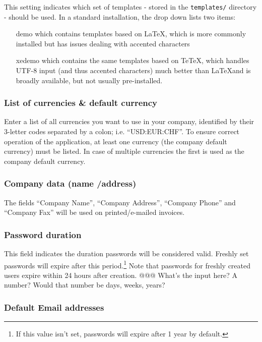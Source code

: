 This setting indicates which set of templates - stored in the
   \texttt{templates/} directory - should be used. In a standard installation, the drop down
   lists two items:
   \begin{itemize}
   \item [demo] which contains templates based on \LaTeX, which is more commonly installed but has issues dealing with accented characters
   \item [xedemo] which contains the same templates based on TeTeX, which handles UTF-8 input (and thus accented characters) much better than \LaTeX and is broadly available, but not usually pre-installed.
   \end{itemize}


\subsubsection{List of currencies \& default currency}

Enter a list of all currencies you want
to use in your company, identified by their 3-letter codes separated by a colon; i.e.
``USD:EUR:CHF''. To ensure correct operation of the application, at least one currency
(the company default currency) must be listed. In case of multiple currencies the first
is used as the company default currency.
\subsubsection{Company data (name /address)}

The fields ``Company Name'', ``Company Address'',
``Company Phone'' and ``Company Fax'' will be used on printed/e-mailed invoices.

\subsubsection{Password duration} This field indicates the duration passwords will be considered valid. Freshly set passwords will expire after this period.\footnote{If this value isn't set, passwords will expire after 1 year by default.} Note that passwords for freshly
created users expire within 24 hours after creation. @@@ What's the input here? A number? Would that number be days, weeks, years?


\subsubsection{Default Email addresses}

